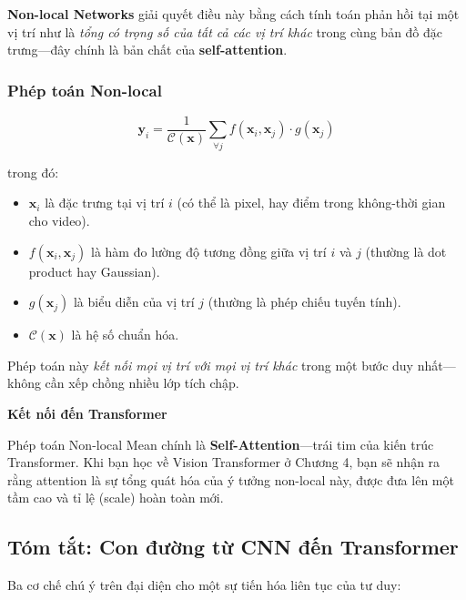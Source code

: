 \textbf{Non-local Networks} \cite{Wang2018nonlocal} giải quyết điều này bằng cách tính toán phản hồi tại một vị trí như là \textit{tổng có trọng số của tất cả các vị trí khác} trong cùng bản đồ đặc trưng—đây chính là bản chất của \textbf{self-attention}.

\subsubsection{Phép toán Non-local}
\label{subsubsec:nonlocal_operation}

\begin{equation}
    \mathbf{y}_i = \frac{1}{\mathcal{C}(\mathbf{x})} \sum_{\forall j} f(\mathbf{x}_i, \mathbf{x}_j) \cdot g(\mathbf{x}_j)
    \label{eq:nonlocal_mean}
\end{equation}

trong đó:
\begin{itemize}
    \item $\mathbf{x}_i$ là đặc trưng tại vị trí $i$ (có thể là pixel, hay điểm trong không-thời gian cho video).
    \item $f(\mathbf{x}_i, \mathbf{x}_j)$ là hàm đo lường độ tương đồng giữa vị trí $i$ và $j$ (thường là dot product hay Gaussian).
    \item $g(\mathbf{x}_j)$ là biểu diễn của vị trí $j$ (thường là phép chiếu tuyến tính).
    \item $\mathcal{C}(\mathbf{x})$ là hệ số chuẩn hóa.
\end{itemize}

Phép toán này \textit{kết nối mọi vị trí với mọi vị trí khác} trong một bước duy nhất—không cần xếp chồng nhiều lớp tích chập.

\begin{mdframed}[style=infobox]
    \textbf{Kết nối đến Transformer}

    Phép toán Non-local Mean chính là \textbf{Self-Attention}—trái tim của kiến trúc Transformer. Khi bạn học về Vision Transformer ở Chương 4, bạn sẽ nhận ra rằng attention là sự tổng quát hóa của ý tưởng non-local này, được đưa lên một tầm cao và tỉ lệ (scale) hoàn toàn mới.
\end{mdframed}

\subsection{Tóm tắt: Con đường từ CNN đến Transformer}
\label{subsec:attention_cnn_summary}

Ba cơ chế chú ý trên đại diện cho một sự tiến hóa liên tục của tư duy:

